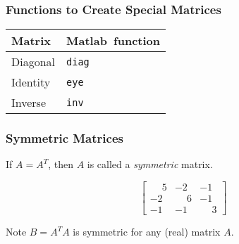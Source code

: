 \documentclass[10pt]{beamer}
\begin{document}
\begin{frame}
\frametitle{Functions to Create Special Matrices}

\begin{center}
    \renewcommand{\arraystretch}{1.3}
    \begin{tabular}{ll}
        Matrix      &  Matlab\ function  \\  \hline
        Diagonal    &  \texttt{diag}     \\
        Identity    & \texttt{eye}     \\
        Inverse     & \texttt{inv}
    \end{tabular}
\end{center}

\end{frame}
\begin{frame}
\frametitle{Symmetric Matrices}

If $A=A^T$, then $A$ is called a \textit{symmetric} matrix.

\begin{equation*}
    \begin{bmatrix}
        \phantom{-}5 & -2           & -1 \\
        -2           & \phantom{-}6 & -1 \\
        -1           & -1           & \phantom{-}3
    \end{bmatrix}
\end{equation*}

\begin{block}{Note}
    $B = A^T A$ is symmetric for any (real) matrix $A$.
\end{block}

\end{frame}
\end{document}
